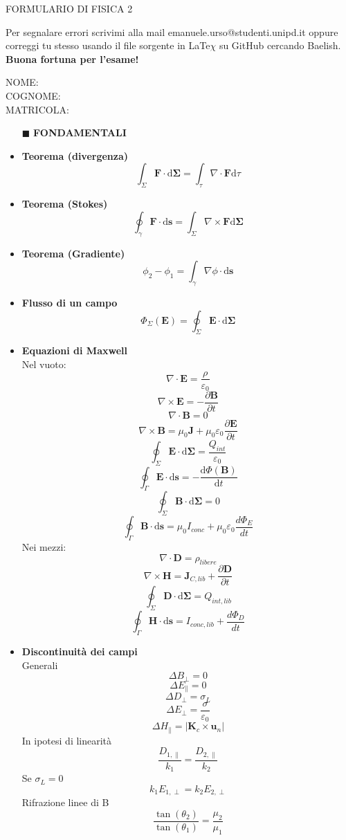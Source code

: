 \documentclass{book}
\newcommand{\g}{\textbf}
\newcommand{\h}{\mathbf}
\newcommand{\e}{\begin{equation}}
\newcommand{\ex}{\end{equation} }
\renewcommand{\it}{\item[$\cdot$]}
\begin{document}
\begin{center}
    FORMULARIO DI FISICA 2 \\
\end{center}
Per segnalare errori scrivimi alla mail emanuele.urso@studenti.unipd.it oppure correggi tu stesso usando il file sorgente in LaTe$\chi$ su GitHub cercando Baelish. \textbf{Buona fortuna per l'esame!} \\
\hline

\begin{multicols}{4}
NOME: \\
COGNOME: \\
MATRICOLA: \\
\begin{itemize}
\hline
\item [$\blacksquare$] \g{FONDAMENTALI}
    \it \g{Teorema (divergenza)}
        \e{\int_\Sigma \h{F} \cdot \mathrm{d} \h{\Sigma}= \int_\tau \nabla \cdot \h{F} \mathrm{d}\tau} \ex
    \it \g{Teorema (Stokes)}
        \e{\oint_\gamma\h{F}\cdot \mathrm{d}\h{s}=\int_\Sigma \nabla \times \h{F} \mathrm{d}\h{\Sigma}} \ex
    \it \g{Teorema (Gradiente)}
        \e{\phi_2-\phi_1=\int_\gamma\nabla\phi\cdot \mathrm{d}\h{s} }\ex
    \it \g{Flusso di un campo}
        \e{ \Phi_\Sigma(\h{E})=\oint_\Sigma \h{E}\cdot \mathrm{d}\h{\Sigma}   
        } \ex
    \it \g{Equazioni di Maxwell} \\
        Nel vuoto:
        \e{\nabla\cdot\h{E}=\frac{\rho}{\varepsilon_0}}\ex
        \e{\nabla\times\h{E}=-\frac{\partial \h{B}}{\partial t}} \ex
        \e{\nabla\cdot\h{B}}=0\ex
        \e{\nabla\times\h{B}=\mu_0\h{J}+\mu_0\varepsilon_0\frac{\partial \h{E}}{\partial t}} \ex
        \e{\oint_\Sigma\h{E}\cdot \mathrm{d}\h{\Sigma}=\frac{Q_{int}}{\varepsilon_0}} \ex
        \e{\oint_\Gamma\h{E}\cdot \mathrm{d}\h{s}=-\frac{\mathrm{d} \Phi(\h{B})}{\mathrm{d}t}} \ex
        \e{\oint_\Sigma\h{B}\cdot \mathrm{d}\h{\Sigma}=0} \ex
        \e{\oint_\Gamma\h{B}\cdot \mathrm{d}\h{s}=\mu_0 I_{conc} +\mu_0\varepsilon_0\frac{d \Phi_E}{d t}} \ex
        Nei mezzi:
        \e{\nabla\cdot\h{D}=\rho_{libere}}\ex
        \e{\nabla\times\h{H}=\h{J}_{C,lib}+\frac{\partial\h{D}}{\partial t}} \ex
        \e{\oint_\Sigma\h{D}\cdot \mathrm{d}\h{\Sigma}=Q_{int,lib}} \ex
        \e{\oint_\Gamma\h{H}\cdot \mathrm{d}\h{s}=I_{conc,lib} + \frac{d \Phi_D}{d t}} \ex
    \it \g{Discontinuità dei campi} \\
        Generali
        \e{\Delta B_\perp=0}\ex
        \e{\Delta E_\parallel=0}\ex
        \e{\Delta D_\perp=\sigma_L} \ex
        \e{\Delta E_\perp=\frac{\sigma}{\varepsilon_0}}\ex
        \e{\Delta H_\parallel=|\h{K}_c\times\h{u}_n|}\ex
        In ipotesi di linearità
        \e{\frac{D_{1,\parallel}}{k_1}=\frac{D_{2,\parallel}}{k_2}}\ex
        Se $\sigma_L=0$
        \e{k_1E_{1,\perp}=k_2E_{2,\perp}}\ex
        Rifrazione linee di B
        \e{\frac{\tan(\theta_2)}{\tan(\theta_1)}=\frac{\mu_2}{\mu_1}} \ex
        

\end{itemize}
\end{multicols}
\end{document}
